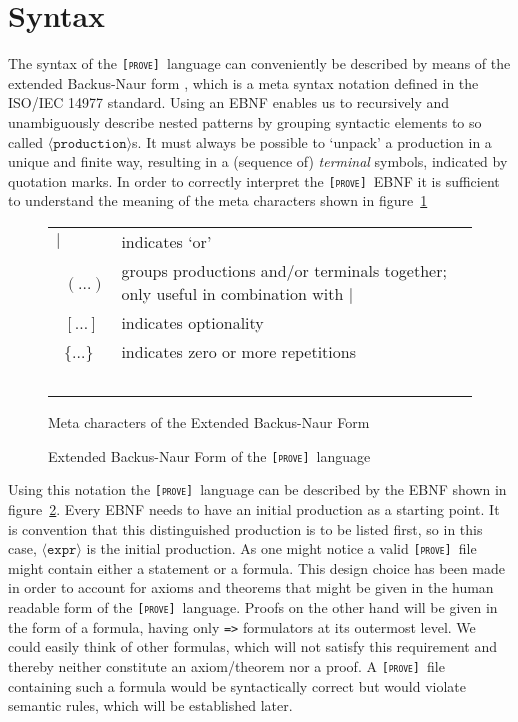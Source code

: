 \documentclass[british]{article}
\newcommand\prv{bc}
\newcommand\m[1]{\texttt{#1}}
\newcommand\name{\texttt{\textsc{[prove]}}}
\providecommand{\tabularnewline}{\\}
\begin{document}
\section{Syntax}

The syntax of the \name\ language can conveniently
be described by means of the extended Backus-Naur form \parencite{Extended},
which is a meta syntax notation defined in the ISO/IEC 14977
\parencite{ISO} standard. Using an EBNF enables us
to recursively and unambiguously describe nested patterns by grouping
syntactic elements to so called $\langle\texttt{production}\rangle$s.
It must always be possible to `unpack' a production in a unique
and finite way, resulting in a (sequence of) \textit{terminal} symbols,
indicated by quotation marks. In order to correctly interpret the
\name\ EBNF it is sufficient to understand
the meaning of the meta characters shown in figure~\ref{fig:meta}

\bigskip{}

\begin{figure}[!ht]
\centering
\begin{doublespace}
\begin{tabular}{l|l}
$|$ & indicates `or'\tabularnewline\
$(\dots)$ & groups productions and/or terminals together; only useful in
combination with $|$\tabularnewline\
$[\dots]$ & indicates optionality\tabularnewline\
$\{\dots\}$ & indicates zero or more repetitions\tabularnewline\
\end{tabular}%
\caption{Meta characters of the Extended Backus-Naur Form}\label{fig:meta}
\end{doublespace}
\end{figure}



\begin{figure}[!ht]
\centering

\caption{Extended Backus-Naur Form of the \name\ language}\label{fig:ebnf}
\end{figure}

\medskip{}

Using this notation the \name\ language can be described by the EBNF shown in 
figure~\ref{fig:ebnf}.
Every EBNF needs to have an initial production as a starting point.
It is convention that this distinguished production is to be listed
first, so in this case, $\langle\texttt{expr}\rangle$ is the initial
production. As one might notice a valid \name\ file
might contain either a statement or a formula. This design choice
has been made in order to account for axioms and theorems that might
be given in the human readable form of the \name\ language.
Proofs on the other hand will be given in the form of a formula, having
only \m{=>} formulators at its outermost level. We could easily think
of other formulas, which will not satisfy this requirement and thereby
neither constitute an axiom/theorem nor a proof. A \name\
file containing such a formula would be syntactically correct but
would violate semantic rules, which will be established later. \pagebreak{}
\end{document}
